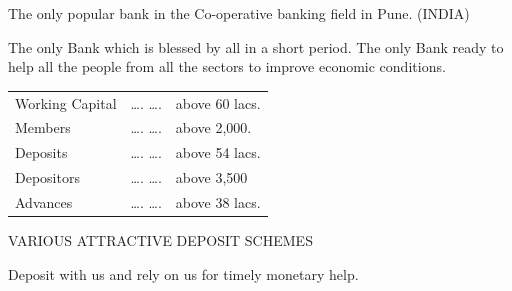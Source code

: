 \documentclass[]{article}
\begin{document}
\vspace{12pt}
The only popular bank in the Co-operative banking field in Pune.
(INDIA)

\vspace{8pt}
The only Bank which is blessed by all in a short period. The only Bank
ready to help all the people from all the sectors to improve economic
conditions.

\vspace{20pt}
\begin{center}
\begin{tabular}{lcl}
\vspace{2mm}

Working Capital &\ldots. \ldots.& above 60 lacs.\\
\vspace{2mm}

Members &\ldots. \ldots.& above 2,000.\\
\vspace{2mm}

Deposits &\ldots. \ldots.& above 54 lacs.\\
\vspace{2mm}

Depositors &\ldots. \ldots.& above 3,500\\
\vspace{2mm}

Advances &\ldots. \ldots.& above 38 lacs.\\
\end{tabular}
\vspace{20pt}


VARIOUS ATTRACTIVE DEPOSIT SCHEMES

\vspace{20pt}
Deposit with us and rely on us for timely monetary help.
\end{center}
\end{document}
